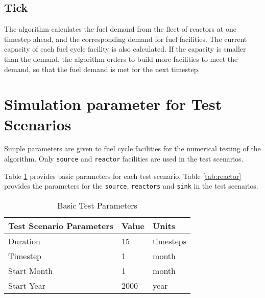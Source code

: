 \documentclass[11pt,letterpaper]{article}
\begin{document}
\subsection{Tick}
The algorithm calculates the fuel demand
from the fleet of reactors at one timestep ahead, and the corresponding demand for fuel facilities.
The current capacity of each fuel cycle facility is also calculated. If the capacity
is smaller than the demand, the algorithm orders to build more facilities to meet the demand,
so that the fuel demand is met for the next timestep.

\section{Simulation parameter for Test Scenarios}
Simple parameters are given to fuel cycle facilities for the numerical testing of 
the algorithm.  Only \texttt{source} and \texttt{reactor} facilities are used in the test scenarios. 

Table \ref{tab:testscenario} provides basic parameters for each test scenario. Table \ref{tab:reactor} provides the parameters for the \texttt{source}, \texttt{reactors} and \texttt{sink} in the test scenarios.

\begin{table}[H]
	\centering
	\caption {Basic Test Parameters}
	\label{tab:testscenario}
	\begin{tabular}{|l|l|l|}
		\hline
		\textbf{Test Scenario Parameters} & \textbf{Value} & \textbf{Units} \\
		\hline
		Duration & 15 & timesteps \\
		Timestep & 1 & month \\
		Start Month & 1 & month \\
		Start Year & 2000 & year \\
		\hline
	\end{tabular}
\end{table}
\end{document}
